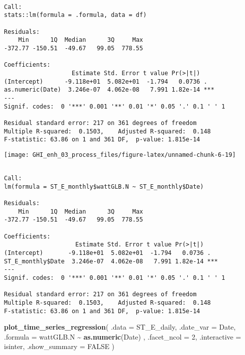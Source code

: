 \documentclass[
  10pt,
  a4paper,oneside]{article}
\newenvironment{Shaded}{\begin{snugshade}}{\end{snugshade}}
\newcommand{\AttributeTok}[1]{\textcolor[rgb]{0.13,0.29,0.53}{#1}}
\newcommand{\ConstantTok}[1]{\textcolor[rgb]{0.56,0.35,0.01}{#1}}
\newcommand{\DecValTok}[1]{\textcolor[rgb]{0.00,0.00,0.81}{#1}}
\newcommand{\FunctionTok}[1]{\textcolor[rgb]{0.13,0.29,0.53}{\textbf{#1}}}
\newcommand{\NormalTok}[1]{#1}
\newcommand{\OtherTok}[1]{\textcolor[rgb]{0.56,0.35,0.01}{#1}}
\newcommand{\SpecialCharTok}[1]{\textcolor[rgb]{0.81,0.36,0.00}{\textbf{#1}}}
\begin{document}
\begin{verbatim}

Call:
stats::lm(formula = .formula, data = df)

Residuals:
    Min      1Q  Median      3Q     Max 
-372.77 -150.51  -49.67   99.05  778.55 

Coefficients:
                   Estimate Std. Error t value Pr(>|t|)    
(Intercept)      -9.118e+01  5.082e+01  -1.794   0.0736 .  
as.numeric(Date)  3.246e-07  4.062e-08   7.991 1.82e-14 ***
---
Signif. codes:  0 '***' 0.001 '**' 0.01 '*' 0.05 '.' 0.1 ' ' 1

Residual standard error: 217 on 361 degrees of freedom
Multiple R-squared:  0.1503,    Adjusted R-squared:  0.148 
F-statistic: 63.86 on 1 and 361 DF,  p-value: 1.815e-14
\end{verbatim}

\begin{center}\texttt{[image: GHI\_enh\_03\_process\_files/figure-latex/unnamed-chunk-6-19]} \end{center}

\begin{Shaded}
\end{Shaded}

\begin{verbatim}

Call:
lm(formula = ST_E_monthly$wattGLB.N ~ ST_E_monthly$Date)

Residuals:
    Min      1Q  Median      3Q     Max 
-372.77 -150.51  -49.67   99.05  778.55 

Coefficients:
                    Estimate Std. Error t value Pr(>|t|)    
(Intercept)       -9.118e+01  5.082e+01  -1.794   0.0736 .  
ST_E_monthly$Date  3.246e-07  4.062e-08   7.991 1.82e-14 ***
---
Signif. codes:  0 '***' 0.001 '**' 0.01 '*' 0.05 '.' 0.1 ' ' 1

Residual standard error: 217 on 361 degrees of freedom
Multiple R-squared:  0.1503,    Adjusted R-squared:  0.148 
F-statistic: 63.86 on 1 and 361 DF,  p-value: 1.815e-14
\end{verbatim}

\begin{Shaded}
\begin{Highlighting}[]
\FunctionTok{plot\_time\_series\_regression}\NormalTok{(}
    \AttributeTok{.data         =}\NormalTok{ ST\_E\_daily,}
    \AttributeTok{.date\_var     =}\NormalTok{ Date,}
    \AttributeTok{.formula      =}\NormalTok{ wattGLB.N }\SpecialCharTok{\textasciitilde{}} \FunctionTok{as.numeric}\NormalTok{(Date)  ,}
    \AttributeTok{.facet\_ncol   =} \DecValTok{2}\NormalTok{,}
    \AttributeTok{.interactive  =}\NormalTok{ isinter,}
    \AttributeTok{.show\_summary =} \ConstantTok{FALSE}
\NormalTok{)}
\end{Highlighting}
\end{Shaded}
\end{document}
